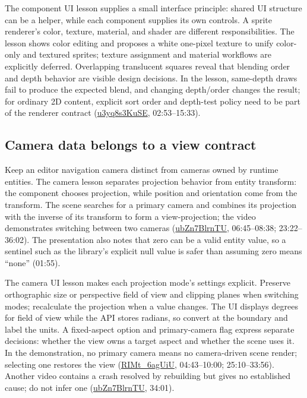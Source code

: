 The component UI lesson supplies a small interface principle: shared UI structure can be a helper, while each component supplies its own controls. A sprite renderer's color, texture, material, and shader are different responsibilities. The lesson shows color editing and proposes a white one-pixel texture to unify color-only and textured sprites; texture assignment and material workflows are explicitly deferred. Overlapping translucent squares reveal that blending order and depth behavior are visible design decisions. In the lesson, same-depth draws fail to produce the expected blend, and changing depth/order changes the result; for ordinary 2D content, explicit sort order and depth-test policy need to be part of the renderer contract (\href{https://www.youtube.com/watch?v=u3yq8s3KuSE}{u3yq8s3KuSE}, 02:53--15:33).

\subsection{Camera data belongs to a view contract}\label{06-engine-ii-ch032-camera-data-belongs-to-a-view-contract}

Keep an editor navigation camera distinct from cameras owned by runtime entities. The camera lesson separates projection behavior from entity transform: the component chooses projection, while position and orientation come from the transform. The scene searches for a primary camera and combines its projection with the inverse of its transform to form a view-projection; the video demonstrates switching between two cameras (\href{https://www.youtube.com/watch?v=ubZn7BlrnTU}{ubZn7BlrnTU}, 06:45--08:38; 23:22--36:02). The presentation also notes that zero can be a valid entity value, so a sentinel such as the library's explicit null value is safer than assuming zero means ``none'' (01:55).

The camera UI lesson makes each projection mode's settings explicit. Preserve orthographic size or perspective field of view and clipping planes when switching modes; recalculate the projection when a value changes. The UI displays degrees for field of view while the API stores radians, so convert at the boundary and label the units. A fixed-aspect option and primary-camera flag express separate decisions: whether the view owns a target aspect and whether the scene uses it. In the demonstration, no primary camera means no camera-driven scene render; selecting one restores the view (\href{https://www.youtube.com/watch?v=RIMt_6agUiU}{RIMt\_6agUiU}, 04:43--10:00; 25:10--33:56). Another video contains a crash resolved by rebuilding but gives no established cause; do not infer one (\href{https://www.youtube.com/watch?v=ubZn7BlrnTU}{ubZn7BlrnTU}, 34:01).


